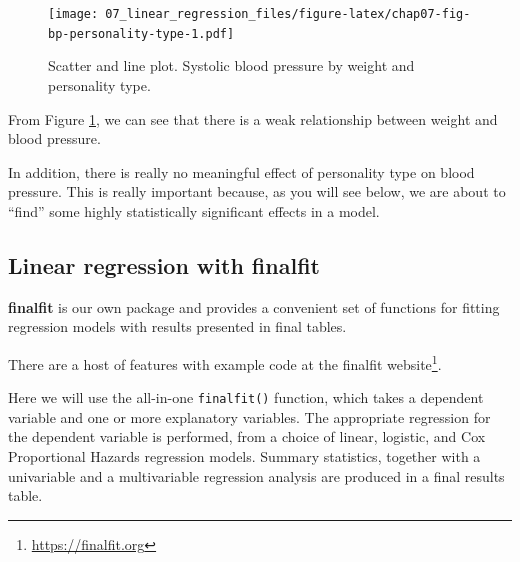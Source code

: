 \documentclass[
  12pt,
  krantz2]{krantz}
\makeatletter
\newenvironment{Shaded}{\begin{snugshade}}{\end{snugshade}}
\newcommand{\DataTypeTok}[1]{\textcolor[rgb]{0.13,0.29,0.53}{#1}}
\newcommand{\KeywordTok}[1]{\textcolor[rgb]{0.13,0.29,0.53}{\textbf{#1}}}
\newcommand{\NormalTok}[1]{#1}
\newcommand{\OperatorTok}[1]{\textcolor[rgb]{0.81,0.36,0.00}{\textbf{#1}}}
\newcommand{\OtherTok}[1]{\textcolor[rgb]{0.56,0.35,0.01}{#1}}
\newcommand{\StringTok}[1]{\textcolor[rgb]{0.31,0.60,0.02}{#1}}
\renewcommand{\href}[2]{#2\footnote{\url{#1}}}
\newenvironment{kframe}{%
\medskip{}
\setlength{\fboxsep}{.8em}
 \def\at@end@of@kframe{}%
 \ifinner\ifhmode%
  \def\at@end@of@kframe{\end{minipage}}%
  \begin{minipage}{\columnwidth}%
 \fi\fi%
 \def\FrameCommand##1{\hskip\@totalleftmargin \hskip-\fboxsep
 \colorbox{shadecolor}{##1}\hskip-\fboxsep
     \hskip-\linewidth \hskip-\@totalleftmargin \hskip\columnwidth}%
 \MakeFramed {\advance\hsize-\width
   \@totalleftmargin\z@ \linewidth\hsize
   \@setminipage}}%
 {\par\unskip\endMakeFramed%
 \at@end@of@kframe}
\renewenvironment{Shaded}{\begin{kframe}}{\end{kframe}}
\makeatother
\begin{document}
\begin{figure}
\centering
\texttt{[image: 07\_linear\_regression\_files/figure-latex/chap07-fig-bp-personality-type-1.pdf]}
\caption{\label{fig:chap07-fig-bp-personality-type}Scatter and line plot. Systolic blood pressure by weight and personality type.}
\end{figure}

From Figure \ref{fig:chap07-fig-bp-personality-type}, we can see that there is a weak relationship between weight and blood pressure.

In addition, there is really no meaningful effect of personality type on blood pressure.
This is really important because, as you will see below, we are about to ``find'' some highly statistically significant effects in a model.

\hypertarget{linear-regression-with-finalfit}{%
\subsection{Linear regression with finalfit}\label{linear-regression-with-finalfit}}


\textbf{finalfit} is our own package and provides a convenient set of functions for fitting regression models with results presented in final tables.

There are a host of features with example code at the \href{https://finalfit.org}{finalfit website}.

Here we will use the all-in-one \texttt{finalfit()} function, which takes a dependent variable and one or more explanatory variables.
The appropriate regression for the dependent variable is performed, from a choice of linear, logistic, and Cox Proportional Hazards regression models.
Summary statistics, together with a univariable and a multivariable regression analysis are produced in a final results table.

\begin{Shaded}
\end{Shaded}
\end{document}
